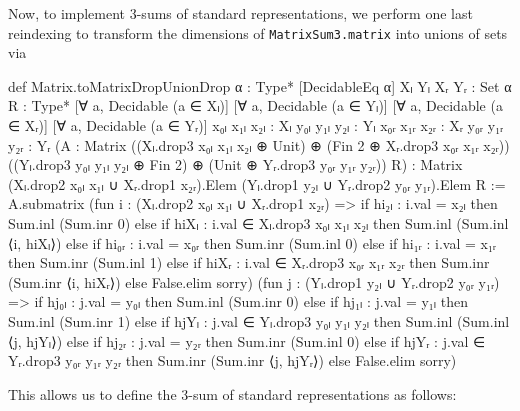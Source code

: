 Now, to implement 3-sums of standard representations, we perform one last reindexing to transform the dimensions of \texttt{MatrixSum3.matrix} into unions of sets via
\begin{leancode}
def Matrix.toMatrixDropUnionDrop {α : Type*}
    [DecidableEq α] {Xₗ Yₗ Xᵣ Yᵣ : Set α}
    {R : Type*}
    [∀ a, Decidable (a ∈ Xₗ)]
    [∀ a, Decidable (a ∈ Yₗ)]
    [∀ a, Decidable (a ∈ Xᵣ)]
    [∀ a, Decidable (a ∈ Yᵣ)]
    {x₀ₗ x₁ₗ x₂ₗ : Xₗ} {y₀ₗ y₁ₗ y₂ₗ : Yₗ}
    {x₀ᵣ x₁ᵣ x₂ᵣ : Xᵣ} {y₀ᵣ y₁ᵣ y₂ᵣ : Yᵣ}
    (A : Matrix
      ((Xₗ.drop3 x₀ₗ x₁ₗ x₂ₗ ⊕ Unit)
      ⊕ (Fin 2 ⊕ Xᵣ.drop3 x₀ᵣ x₁ᵣ x₂ᵣ))
      ((Yₗ.drop3 y₀ₗ y₁ₗ y₂ₗ ⊕ Fin 2)
      ⊕ (Unit ⊕ Yᵣ.drop3 y₀ᵣ y₁ᵣ y₂ᵣ))
      R) :
    Matrix
      (Xₗ.drop2 x₀ₗ x₁ₗ ∪ Xᵣ.drop1 x₂ᵣ).Elem
      (Yₗ.drop1 y₂ₗ ∪ Yᵣ.drop2 y₀ᵣ y₁ᵣ).Elem
      R :=
  A.submatrix
    (fun i : (Xₗ.drop2 x₀ₗ x₁ₗ ∪ Xᵣ.drop1 x₂ᵣ) =>
      if hi₂ₗ : i.val = x₂ₗ then
        Sum.inl (Sum.inr 0) else
      if hiXₗ : i.val ∈ Xₗ.drop3 x₀ₗ x₁ₗ x₂ₗ then
        Sum.inl (Sum.inl ⟨i, hiXₗ⟩) else
      if hi₀ᵣ : i.val = x₀ᵣ then
        Sum.inr (Sum.inl 0) else
      if hi₁ᵣ : i.val = x₁ᵣ then
        Sum.inr (Sum.inl 1) else
      if hiXᵣ : i.val ∈ Xᵣ.drop3 x₀ᵣ x₁ᵣ x₂ᵣ then
        Sum.inr (Sum.inr ⟨i, hiXᵣ⟩) else
      False.elim sorry)
    (fun j : (Yₗ.drop1 y₂ₗ ∪ Yᵣ.drop2 y₀ᵣ y₁ᵣ) =>
      if hj₀ₗ : j.val = y₀ₗ then
        Sum.inl (Sum.inr 0) else
      if hj₁ₗ : j.val = y₁ₗ then
        Sum.inl (Sum.inr 1) else
      if hjYₗ : j.val ∈ Yₗ.drop3 y₀ₗ y₁ₗ y₂ₗ then
        Sum.inl (Sum.inl ⟨j, hjYₗ⟩) else
      if hj₂ᵣ : j.val = y₂ᵣ then
        Sum.inr (Sum.inl 0) else
      if hjYᵣ : j.val ∈ Yᵣ.drop3 y₀ᵣ y₁ᵣ y₂ᵣ then
        Sum.inr (Sum.inr ⟨j, hjYᵣ⟩) else
      False.elim sorry)
\end{leancode}
This allows us to define the 3-sum of standard representations as follows:
